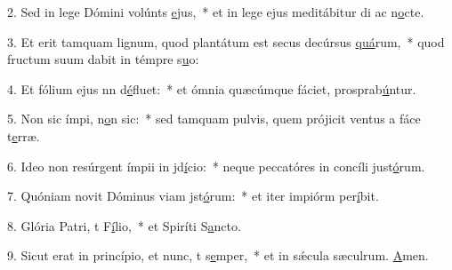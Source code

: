 2. Sed in lege Dómini volúnts \uline{e}jus,~* et in lege ejus meditábitur di ac n\uline{o}cte.\par 
3. Et erit tamquam lignum, quod plantátum est secus decúrsus \uline{quá}rum,~* quod fructum suum dabit in témpre s\uline{u}o:\par 
4. Et fólium ejus nn d\uline{é}fluet:~* et ómnia quæcúmque fáciet, prosprab\uline{ú}ntur.\par 
5. Non sic ímpi, n\uline{o}n sic:~* sed tamquam pulvis, quem prójicit ventus a fáce t\uline{e}rræ.\par 
6. Ideo non resúrgent ímpii in jd\uline{í}cio:~* neque peccatóres in concíli just\uline{ó}rum.\par 
7. Quóniam novit Dóminus viam jst\uline{ó}rum:~* et iter impiórm per\uline{í}bit.\par 
8. Glória Patri, t F\uline{í}lio,~* et Spiríti S\uline{a}ncto.\par 
9. Sicut erat in princípio, et nunc, t s\uline{e}mper,~* et in sǽcula sæculrum. \uline{A}men.\par 

